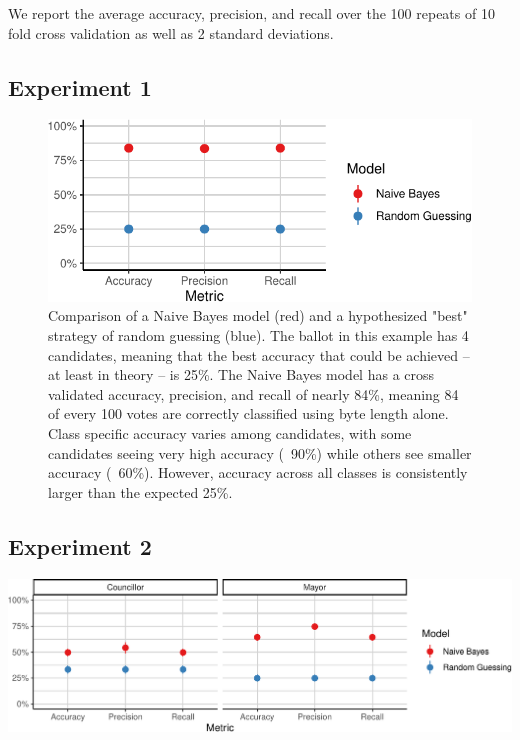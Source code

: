 \documentclass[
]{article}
\begin{document}
We report the average accuracy, precision, and recall over the 100
repeats of 10 fold cross validation as well as 2 standard deviations.

\newpage

\hypertarget{experiment-1}{%
\subsection{Experiment 1}\label{experiment-1}}

\begin{figure}[h!]

{\centering \includegraphics{Untitled_files/figure-latex/experiment-1-1} 

}

\caption{Comparison of a Naive Bayes model (red) and a hypothesized "best" strategy of random guessing (blue).  The ballot in this example has 4 candidates, meaning that the best accuracy that could be achieved -- at least in theory -- is 25\%. The Naive Bayes model has a cross validated accuracy, precision, and recall of nearly 84\%, meaning 84 of every 100 votes are correctly classified using byte length alone.  Class specific accuracy varies among candidates, with some candidates seeing very high accuracy (~90\%) while others see smaller accuracy (~60\%).  However, accuracy across all classes is consistently larger than the expected 25\%.}\label{fig:experiment-1}
\end{figure}

\hypertarget{experiment-2}{%
\subsection{Experiment 2}\label{experiment-2}}

\begin{center}\includegraphics{Untitled_files/figure-latex/experiment-2-1} \end{center}
\end{document}
